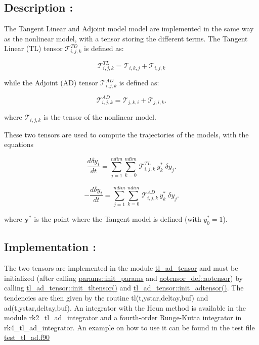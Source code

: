 \subsection*{Description \+:}

The Tangent Linear and Adjoint model model are implemented in the same way as the nonlinear model, with a tensor storing the different terms. The Tangent Linear (TL) tensor $\mathcal{T}_{i,j,k}^{TD}$ is defined as\+:

\[ \mathcal{T}_{i,j,k}^{TL} = \mathcal{T}_{i,k,j} + \mathcal{T}_{i,j,k} \]

while the Adjoint (AD) tensor $\mathcal{T}_{i,j,k}^{AD}$ is defined as\+:

\[ \mathcal{T}_{i,j,k}^{AD} = \mathcal{T}_{j,k,i} + \mathcal{T}_{j,i,k} . \]

where $ \mathcal{T}_{i,j,k}$ is the tensor of the nonlinear model.

These two tensors are used to compute the trajectories of the models, with the equations

\[ \frac{d\delta y_i}{dt} = \sum_{j=1}^{ndim}\sum_{k=0}^{ndim} \, \mathcal{T}_{i,j,k}^{TL} \, y^{\ast}_k \; \delta y_j . \]

\[ -\frac{d\delta y_i}{dt} = \sum_{j=1}^{ndim} \sum_{k=0}^{ndim} \, \mathcal{T}_{i,j,k}^{AD} \, y^{\ast}_k \; \delta y_j . \]

where $\boldsymbol{y}^{\ast}$ is the point where the Tangent model is defined (with $y_0^{\ast}=1$).

\subsection*{Implementation \+:}

The two tensors are implemented in the module \hyperlink{namespacetl__ad__tensor}{tl\+\_\+ad\+\_\+tensor} and must be initialized (after calling \hyperlink{namespaceparams_aa5d1f7f88b00cf3705691de2f6f92a08}{params\+::init\+\_\+params} and \hyperlink{namespaceaotensor__def_a0dc43bc9294a18f2fe57b67489f1702f}{aotensor\+\_\+def\+::aotensor}) by calling \hyperlink{namespacetl__ad__tensor_a8a94fe84e907fc8835f798eddcff38e8}{tl\+\_\+ad\+\_\+tensor\+::init\+\_\+tltensor()} and \hyperlink{namespacetl__ad__tensor_a199cc07a7172f6cf662f9a5bd6f3d45c}{tl\+\_\+ad\+\_\+tensor\+::init\+\_\+adtensor()}. The tendencies are then given by the routine tl(t,ystar,deltay,buf) and ad(t,ystar,deltay,buf). An integrator with the Heun method is available in the module rk2\+\_\+tl\+\_\+ad\+\_\+integrator and a fourth-\/order Runge-\/\+Kutta integrator in rk4\+\_\+tl\+\_\+ad\+\_\+integrator. An example on how to use it can be found in the test file \hyperlink{test__tl__ad_8f90}{test\+\_\+tl\+\_\+ad.\+f90} 